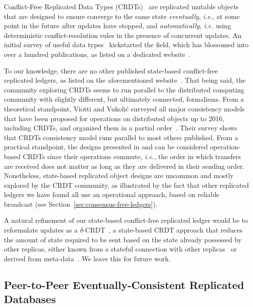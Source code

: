 \documentclass[9pt, oneside]{article}   	%
\begin{document}
Conflict-Free Replicated Data Types (CRDTs)~\cite{shapiro:hal-00932836} are replicated mutable objects that are designed to ensure converge to the same state \textit{eventually}, \textit{i.e.}, at some point in the future after updates have stopped, and \textit{automatically}, \textit{i.e.} using deterministic conflict-resolution rules in the presence of concurrent updates. An initial survey of useful data types~\cite{shapiro:inria-00555588} kickstarted the field, which has blossomed into over a hundred publications, as listed on a dedicated website~\cite{crdt-website}.

To our knowledge, there are no other published state-based conflict-free replicated ledgers, as listed on the aforementioned website~\cite{crdt-website}. That being said, the community exploring CRDTs seems to run parallel to the distributed computing community with slightly different, but ultimately connected, formalisms. From a theoretical standpoint, Viotti and  Vukoli\'{c} surveyed all major consistency models that have been proposed for operations on distributed objects up to 2016, including CRDTs,  and organized them in a partial order~\cite{viotti2016consistency-db-survey}. Their survey shows that CRDTs consistency model runs parallel to most others published. From a practical standpoint, the designs presented in \cite{guerraoui2021consensus} and \cite{collins2020broadcast-payment} can be considered operation-based CRDTs since their operations commute, \textit{i.e.}, the order in which transfers are received does not matter as long as they are delivered in their sending order. Nonetheless, state-based replicated object designs are uncommon and mostly explored by the CRDT community, as illustrated by the fact that other replicated ledgers we have found all use an operational approach, based on reliable broadcast (see Section~\ref{sec:consensus-free-ledgers}).

A natural refinement of our state-based conflict-free replicated ledger would be to reformulate updates as a $\delta$-CRDT~\cite{Almeida2018delta}, a state-based CRDT approach that reduces the amount of state required to be sent based on the state already possessed by other replicas, either known from a stateful connection with other replicas~\cite{Almeida2018delta} or derived from meta-data~\cite{vanderLinde06delta}. We leave this for future work.

\subsection{Peer-to-Peer Eventually-Consistent Replicated Databases}
\label{sec:p2p-db}
\end{document}
